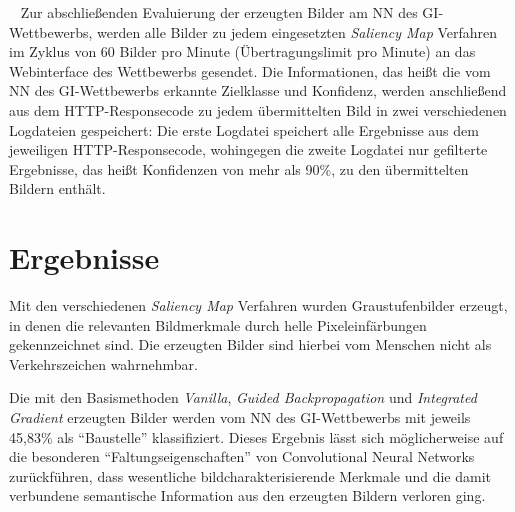 ~\newline
Zur abschließenden Evaluierung der erzeugten Bilder am \ac{NN} des \ac{GI}-Wettbewerbs, werden alle Bilder zu jedem eingesetzten \textit{Saliency Map} Verfahren im Zyklus von 60 Bilder pro Minute (Übertragungslimit pro Minute) an das Webinterface des Wettbewerbs gesendet. Die Informationen, das heißt die vom \ac{NN} des \ac{GI}-Wettbewerbs erkannte Zielklasse und Konfidenz, werden anschließend aus dem HTTP-Responsecode zu jedem übermittelten Bild in zwei verschiedenen Logdateien gespeichert: Die erste Logdatei speichert alle Ergebnisse aus dem jeweiligen HTTP-Responsecode, wohingegen die zweite Logdatei nur gefilterte Ergebnisse, das heißt Konfidenzen von mehr als 90\%, zu den übermittelten Bildern enthält.


%
%
%
%
%

\section{Ergebnisse}
\label{sec:SalErgebnisse}
Mit den verschiedenen \textit{Saliency Map} Verfahren wurden Graustufenbilder erzeugt, in denen die relevanten Bildmerkmale durch helle Pixeleinfärbungen gekennzeichnet sind. 
Die erzeugten Bilder sind hierbei vom Menschen nicht als Verkehrszeichen wahrnehmbar.

Die mit den Basismethoden \textit{Vanilla}, \textit{Guided Backpropagation} und \textit{Integrated Gradient} erzeugten Bilder werden vom \ac{NN} des \ac{GI}-Wettbewerbs mit jeweils 45,83\% als "`Baustelle"' klassifiziert.
Dieses Ergebnis lässt sich möglicherweise auf die besonderen "`Faltungseigenschaften"' von Convolutional Neural Networks zurückführen, dass wesentliche bildcharakterisierende Merkmale und die damit verbundene semantische Information aus den erzeugten Bildern verloren ging.

